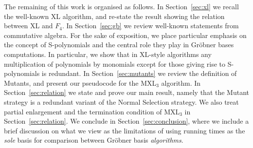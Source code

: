 The remaining of this work is organised as follows.  In Section~\ref{sec:xl} we recall the well-known XL algorithm, and re-state the result showing the relation between XL and $F_4$.  In Section~\ref{sec:gb} we review well-known statements from commutative algebra. For the sake of exposition, we place particular emphasis on the concept of
S-polynomials and the central role they play in Gr\"obner bases computations. In particular, we show that in XL-style algorithms any multiplication of polynomials by monomials except for those giving rise to S-polynomials is redundant. In Section~\ref{sec:mutants} we review the definition of Mutants, and present our pseudocode for the MXL$_3$ algorithm. In Section~\ref{sec:relation} we state and prove our main result, namely that the Mutant strategy is a redundant variant of the Normal Selection strategy. We also treat partial enlargement and the termination condition of MXL$_3$ in Section~\ref{sec:relation}. We conclude in Section~\ref{sec:conclusion}, where we include a brief discussion on what we view as the limitations of using running times as the {\it sole} basis for comparison between Gr\"obner basis {\it algorithms}.
